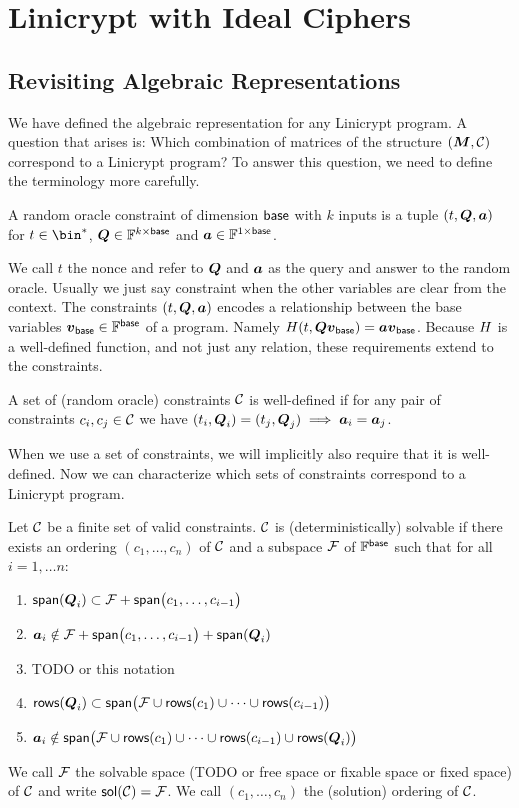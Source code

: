 \chapter{Linicrypt with Ideal Ciphers}

\section{Revisiting Algebraic Representations}
We have defined the algebraic representation for any Linicrypt program.
A question that arises is: Which combination of matrices of the structure $(\boldsymbol{M}, \mathcal{C})$
correspond to a Linicrypt program?
To answer this question, we need to define the terminology more carefully.

\begin{defn}
A random oracle constraint of dimension $\mathsf{base}$ with $k$ inputs is a tuple $(t, \boldsymbol Q, \boldsymbol a)$ for
$t \in \bin^*$, $\boldsymbol{Q} \in \mathbb{F}^{k \times \mathsf{base}}$ and $\boldsymbol a \in \mathbb{F}^{1 \times \mathsf{base}}$.
\end{defn}

We call $t$ the nonce and refer to $\boldsymbol{Q}$ and $\boldsymbol a$ as the query and answer to the random oracle.
Usually we just say constraint when the other variables are clear from the context.
The constraints $(t, \boldsymbol{Q}, \boldsymbol a)$ encodes a relationship between the base variables $\boldsymbol v_{\mathsf{base}} \in \mathbb{F}^{\mathsf{base}}$ of a program.
Namely $H(t, \boldsymbol{Q} \boldsymbol v_{\mathsf{base}}) = \boldsymbol a \boldsymbol v_{\mathsf{base}}$.
Because $H$ is a well-defined function,
and not just any relation,
these requirements extend to the constraints.

\begin{defn}
A set of (random oracle) constraints $\mathcal{C}$ is well-defined if for any pair of constraints 
$c_i, c_j \in \mathcal{C}$ we have $(t_i,\boldsymbol{Q}_i) = (t_j, \boldsymbol{Q}_j) \implies \boldsymbol a_i = \boldsymbol a_j$.
\end{defn}

When we use a set of constraints, we will implicitly also require that it is well-defined.
Now we can characterize which sets of constraints correspond to a Linicrypt program.

\begin{defn}[Solvable]
Let $\mathcal{C}$ be a finite set of valid constraints.
$\mathcal{C}$ is (deterministically) solvable if there exists an ordering $(c_1, \dots, c_n)$ of $\mathcal{C}$
and a subspace $\mathcal{F}$ of $\mathbb{F}^{\mathsf{base}}$
such that for all $i=1, \dots n$:
\begin{enumerate}
\item
    $\mathsf{span}(\boldsymbol{Q}_i) \subset \mathcal{F} + \mathsf{span} \big(c_1, \dots, c_{i-1} \big)$
\item
    $\boldsymbol a_i \notin \mathcal{F} + \mathsf{span} \big(c_1, \dots, c_{i-1} \big) + \mathsf{span}(\boldsymbol{Q}_i)$
\item
    TODO or this notation
\item
    $\mathsf{rows}(\boldsymbol{Q}_i) \subset \mathsf{span} \big(\mathcal{F} \cup \mathsf{rows}(c_1) \cup \dots \cup \mathsf{rows}(c_{i-1})\big)$
\item
    $\boldsymbol a_i \notin \mathsf{span} \big(\mathcal{F} \cup \mathsf{rows}(c_1) \cup \dots \cup \mathsf{rows}(c_{i-1}) \cup \mathsf{rows}(\boldsymbol{Q}_i) \big)$
\end{enumerate}

We call $\mathcal{F}$ the solvable space (TODO or free space or fixable space or fixed space) of $\mathcal{C}$
and write $\mathsf{sol}(\mathcal{C}) = \mathcal{F}$.
We call $(c_1, \dots, c_n)$ the (solution) ordering of $\mathcal{C}$.
\end{defn}

